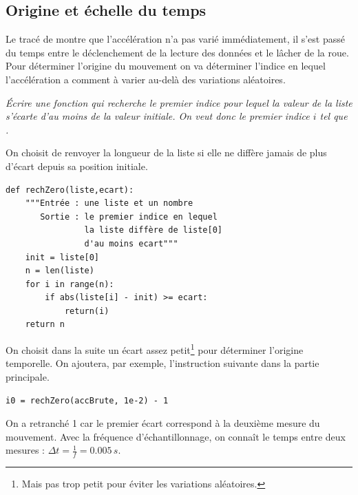 \subsection{Origine et échelle du temps}
Le tracé de  montre que l'accélération n'a pas varié immédiatement, il s'est passé du temps entre le déclenchement de la lecture des données et le lâcher de la roue. Pour déterminer l'origine du mouvement on va déterminer l'indice en lequel l'accélération a comment à varier au-delà des variations aléatoires.
\begin{Exercise}\it 
Écrire une fonction  qui recherche le premier indice pour lequel la valeur de la liste s'écarte d'au moins  de la valeur initiale. On veut donc le premier indice $i$ tel que .
\end{Exercise}
\begin{Answer} On choisit de renvoyer la longueur de la liste si elle ne diffère jamais de plus d'écart depuis sa position initiale.
\begin{lstlisting}
def rechZero(liste,ecart):
    """Entrée : une liste et un nombre
       Sortie : le premier indice en lequel
                la liste diffère de liste[0] 
                d'au moins ecart"""
    init = liste[0]
    n = len(liste)
    for i in range(n):
        if abs(liste[i] - init) >= ecart:
            return(i)
    return n
\end{lstlisting}
\end{Answer}
\medskip

On choisit dans la suite un écart assez petit\footnote{Mais pas trop petit pour éviter les variations aléatoires.} pour déterminer l'origine temporelle. On ajoutera, par exemple, l'instruction suivante dans la partie principale.
\begin{lstlisting}
i0 = rechZero(accBrute, 1e-2) - 1
\end{lstlisting}
On a retranché 1 car le premier écart correspond à la deuxième mesure du mouvement.
\medskip
Avec la fréquence d'échantillonnage, on connaît le temps entre deux mesures : $\Delta t=\frac 1f=0.005\, s$. 

